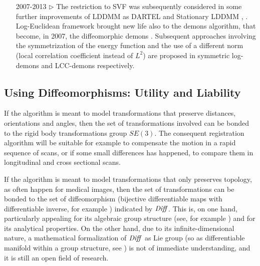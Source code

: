 \begin{enumerate}
	\item[2007-2013 $\triangleright$] The restriction to SVF was subsequently considered in some further improvements of LDDMM  as DARTEL and Stationary LDDMM \cite{Ashburner:07}, \cite{hernandez2007registration}. 
	Log-Euclidean framework brought new life also to the demons algorithm, that  become, in 2007, the diffeomorphic demons \cite{vercauteren2007non}.
	Subsequent approaches involving the symmetrization of the energy function and the use of a different norm (local correlation coefficient instead of $L^{2}$) are proposed in symmetric log-demons \cite{vercauteren08} and LCC-demons \cite{lorenzi2013lcc} respectively.
	
\end{enumerate}


\subsection{Using Diffeomorphisms: Utility and Liability}\label{se:diffe_util_and_liab}

If the algorithm is meant to model transformations that preserve distances, orientations and angles, then the set of transformations involved can be bonded to the rigid body transformations group $SE(3)$. The consequent registration algorithm will be suitable for example to compensate the motion in a rapid sequence of scans, or if some small differences has happened, to compare them in longitudinal and cross sectional scans.

If the algorithm is meant to model transformations that only preserves topology, as often happen for medical images, then the set of transformations can be bonded to the set of diffeomorphism (bijective differentiable maps with differentiable inverse, for example \cite{lee2012introduction}) indicated by $\text{\emph{Diff}}$. This is, on one hand, particularly appealing for its algebraic group structure (see, for example \cite{artin2011algebra}) and for its analytical properties. On the other hand, due to its infinite-dimensional nature, a mathematical formalization of $\text{\emph{Diff}}$ as Lie group (so as differentiable manifold within a group structure, see \cite{warner}) is not of immediate understanding, and it is still an open field of research.


